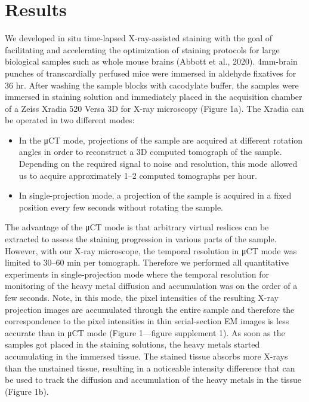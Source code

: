 \documentclass{article}
\begin{document}
\section*{Results}
We developed in situ time-lapsed X-ray-assisted staining with the goal of facilitating and accelerating the optimization of staining protocols for large biological samples such as whole mouse brains (Abbott et al., 2020). 4mm-brain punches of transcardially perfused mice were immersed in aldehyde fixatives for 36 hr. After washing the sample blocks with cacodylate buffer, the samples were immersed in staining solution and immediately placed in the acquisition chamber of a Zeiss Xradia 520 Versa 3D for X-ray microscopy (Figure 1a). The Xradia can be operated in two different modes:
\begin{itemize}
\item In the μCT mode, projections of the sample are acquired at different rotation angles in order to reconstruct a 3D computed tomograph of the sample. Depending on the required signal to noise and resolution, this mode allowed us to acquire approximately 1–2 computed tomographs per hour.
\item In single-projection mode, a projection of the sample is acquired in a fixed position every few seconds without rotating the sample.
\end{itemize}

The advantage of the μCT mode is that arbitrary virtual reslices can be extracted to assess the staining progression in various parts of the sample. However, with our X-ray microscope, the temporal resolution in μCT mode was limited to 30–60 min per tomograph. Therefore we performed all quantitative experiments in single-projection mode where the temporal resolution for monitoring of the heavy metal diffusion and accumulation was on the order of a few seconds. Note, in this mode, the pixel intensities of the resulting X-ray projection images are accumulated through the entire sample and therefore the correspondence to the pixel intensities in thin serial-section EM images is less accurate than in μCT mode (Figure 1—figure supplement 1). As soon as the samples got placed in the staining solutions, the heavy metals started accumulating in the immersed tissue. The stained tissue absorbs more X-rays than the unstained tissue, resulting in a noticeable intensity difference that can be used to track the diffusion and accumulation of the heavy metals in the tissue (Figure 1b).
\end{document}
